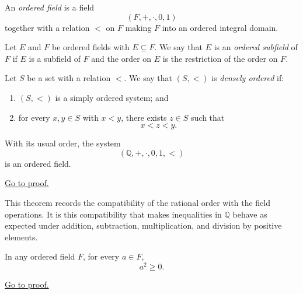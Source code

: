 \begin{definition}
\label{def:ordered-field}
An \emph{ordered field} is a field
\[
(F,+,\cdot,0,1)
\]
together with a relation $<$ on $F$ making $F$ into an ordered integral
domain.
\end{definition}

\begin{definition}
\label{def:ordered-subfield}
Let $E$ and $F$ be ordered fields with $E\subseteq F$. We say that $E$ is an
\emph{ordered subfield} of $F$ if $E$ is a subfield of $F$ and the order on
$E$ is the restriction of the order on $F$.
\end{definition}

\begin{definition}
\label{def:densely-ordered-system}
Let $S$ be a set with a relation $<$. We say that $(S,<)$ is
\emph{densely ordered} if:
\begin{enumerate}
  \item $(S,<)$ is a simply ordered system; and
  \item for every $x,y\in S$ with $x<y$, there exists $z\in S$ such that
  \[
  x<z<y.
  \]
\end{enumerate}
\end{definition}

\begin{theorem}
\label{thm:q-is-ordered-field}
With its usual order, the system
\[
(\mathbb{Q},+,\cdot,0,1,<)
\]
is an ordered field.
\end{theorem}

\begin{remark*}[Proof]
\hyperref[prf:q-is-ordered-field]{Go to proof.}
\end{remark*}

\begin{remark}
This theorem records the compatibility of the rational order with the field
operations. It is this compatibility that makes inequalities in $\mathbb{Q}$
behave as expected under addition, subtraction, multiplication, and division
by positive elements.
\end{remark}

\begin{theorem}
\label{thm:squares-nonnegative}
In any ordered field $F$, for every $a\in F$,
\[
a^2\ge 0.
\]
\end{theorem}

\begin{remark*}[Proof]
\hyperref[prf:squares-nonnegative]{Go to proof.}
\end{remark*}

